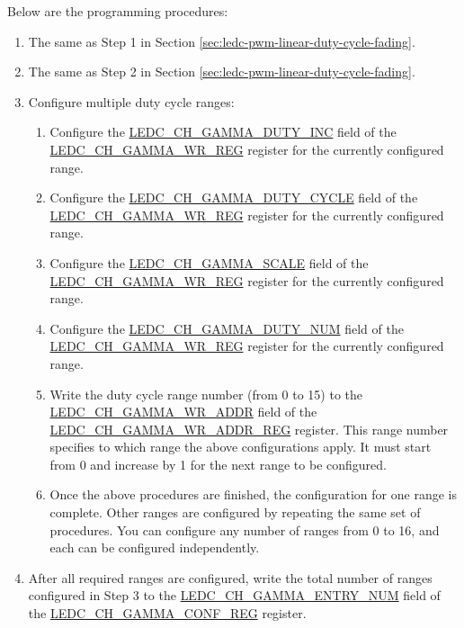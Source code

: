 \documentclass[main\_\_EN.tex]{subfiles}
\begin{document}
Below are the programming procedures:

\begin{enumerate}
    \item The same as Step 1 in Section \ref{sec:ledc-pwm-linear-duty-cycle-fading}.
    \item The same as Step 2 in Section \ref{sec:ledc-pwm-linear-duty-cycle-fading}.
    \item Configure multiple duty cycle ranges:
    \begin{enumerate}
        \item Configure the \hyperref[fielddesc:LEDCCHNGAMMADUTYINC]{LEDC\_CH\_GAMMA\_DUTY\_INC} field of the \hyperref[regdesc:LEDCCHNGAMMAWRREG]{LEDC\_CH\_GAMMA\_WR\_REG} register for the currently configured range.
        \item Configure the \hyperref[fielddesc:LEDCCHNGAMMADUTYCYCLE]{LEDC\_CH\_GAMMA\_DUTY\_CYCLE} field of the \hyperref[regdesc:LEDCCHNGAMMAWRREG]{LEDC\_CH\_GAMMA\_WR\_REG} register for the currently configured range.
        \item Configure the \hyperref[fielddesc:LEDCCHNGAMMASCALE]{LEDC\_CH\_GAMMA\_SCALE} field of the \hyperref[regdesc:LEDCCHNGAMMAWRREG]{LEDC\_CH\_GAMMA\_WR\_REG} register for the currently configured range.
        \item Configure the \hyperref[fielddesc:LEDCCHNGAMMADUTYNUM]{LEDC\_CH\_GAMMA\_DUTY\_NUM} field of the \hyperref[regdesc:LEDCCHNGAMMAWRREG]{LEDC\_CH\_GAMMA\_WR\_REG} register for the currently configured range.
        \item Write the duty cycle range number (from 0 to 15) to the \hyperref[regdesc:LEDCCHNGAMMAWRADDRREG]{LEDC\_CH\_GAMMA\_WR\_ADDR} field of the \hyperref[fielddesc:LEDCCHNGAMMAWRADDR]{LEDC\_CH\_GAMMA\_WR\_ADDR\_REG} register. This range number specifies to which range the above configurations apply. It must start from 0 and increase by 1 for the next range to be configured.
        \item Once the above procedures are finished, the configuration for one range is complete. Other ranges are configured by repeating the same set of procedures. You can configure any number of ranges from 0 to 16, and each can be configured independently.
    \end{enumerate}
    \item After all required ranges are configured, write the total number of ranges configured in Step 3 to the \hyperref[fielddesc:LEDCCHNGAMMAENTRYNUM]{LEDC\_CH\_GAMMA\_ENTRY\_NUM} field of the \hyperref[regdesc:LEDCCHNGAMMACONFREG]{LEDC\_CH\_GAMMA\_CONF\_REG} register.

\end{enumerate}
\end{document}
